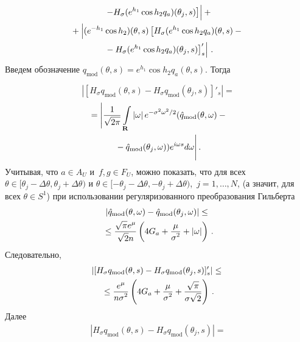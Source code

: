 \begin{multicols}{2}
\begin{multline*}
\left.{}\left.-H_\sigma(e^{h_1}\cos{h_2}q_a)(\theta_j,s)\right ]
\vphantom{\left.\left.+e^{-h_1}\sin{h_2}H_\sigma(e^{h_1}\sin{h_2}q_a)(\theta,s)\right)'_s\right| \leq{}}\!
\right|
 +{}\\
{}+\left| 
\vphantom{\left.\left.+e^{-h_1}\sin{h_2}H_\sigma(e^{h_1}\sin{h_2}q_a)(\theta,s)\right)'_s\right| \leq{}}
(e^{-h_1}\cos{h_2})(\theta,s)\left [H_\sigma(e^{h_1}\cos{h_2}q_a)(\theta,s)-{}\right.\right.\\
\left.\left.{}-H_\sigma(e^{h_1}\cos{h_2}q_a)(\theta_j,s)\right ]'_s\right| \,.
\end{multline*}
Введем обозначение $q_{\mathrm{mod}}(\theta,s)=e^{h_1}\cos{h_2}q_a(\theta,s)$. 
Тогда

\noindent
\begin{equation*}
\!\!\!\!\left|[H_\sigma q_{\mathrm{mod}}(\theta,s)-H_\sigma q_{\mathrm{mod}}(\theta_j,s)]'_s\right|={}
\end{equation*}
\begin{multline*}
{}=\Bigg\vert \displaystyle\frac{\displaystyle 1\mathstrut}{\displaystyle \sqrt{2\pi}\mathstrut}\int\limits_{\mathbf{R}}\left|\omega\right|e^{-\sigma^2\omega^2/2}(\hat{q}_{\mathrm{mod}}
(\theta,\omega)-{}\\
{}-\hat{q}_{\mathrm{mod}}(\theta_j,\omega))e^{i\omega s}d\omega\Bigg\vert\,.
\end{multline*}
Учитывая, что $a\in A_U$ и~$f, g\in F_U$, можно показать, что для всех 
$\theta\in[\theta_j-\Delta\theta,\theta_j+\Delta\theta)$ и 
$\theta\in[-\theta_j-\Delta\theta,-\theta_j+\Delta\theta)$,\ $j=1,\ldots ,N$, 
(а значит, для всех $\theta\in S^1$) при использовании регуляризованного преобразования Гильберта
\begin{multline}
\left|\hat{q}_{\mathrm{mod}}(\theta,\omega)-\hat{q}_{\mathrm{mod}}(\theta_j,\omega)\right|\leq{}\\
{}\leq\displaystyle\frac{\displaystyle \sqrt{\pi} e^\mu\mathstrut}{\displaystyle \sqrt{2}n\mathstrut}
\left(4G_a+\displaystyle\frac{\displaystyle \mu\mathstrut}{\displaystyle \sigma^2\mathstrut}+\left|\omega\right|\right)\,.
\label{e6sh}
\end{multline}
Следовательно,
\begin{multline*}
\left|[H_\sigma q_{\mathrm{mod}}(\theta,s)-H_\sigma q_{\mathrm{mod}}(\theta_j,s)]'_s\right|\leq{}\\
{}\leq\displaystyle\frac{\displaystyle e^\mu\mathstrut}{\displaystyle n\sigma^2\mathstrut}\left(4G_a+\displaystyle\frac{\displaystyle \mu\mathstrut}{\displaystyle \sigma^2\mathstrut}+\displaystyle\frac{\displaystyle \sqrt{\pi}\mathstrut}{\displaystyle \sigma\sqrt{2}\mathstrut}\right)\,.
\end{multline*}
Далее
\begin{multline}
\left|H_\sigma q_{\mathrm{mod}}(\theta,s)-H_\sigma q_{\mathrm{mod}}(\theta_j,s)\right|={}\\

\end{multline}
\end{multicols}
